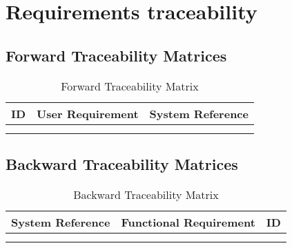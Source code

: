 \documentclass[Main]{subfiles}
\begin{document}
\chapter{Requirements traceability}


\section{Forward Traceability Matrices}

\begin{longtable}{p{1.8cm} p{10.4cm} l} \hline
ID & User Requirement & System Reference \\\hline

 \\\hline
\caption{Forward Traceability Matrix}
\label{Tab:Forward}
\end{longtable}



\newpage
\section{Backward Traceability Matrices}

\begin{longtable}{l p{10.4cm} p{1.8cm} } \hline
System Reference & Functional Requirement & ID\\\hline


\\\hline
\caption{Backward Traceability Matrix}
\label{Tab:Backward}
\end{longtable}
\end{document}
